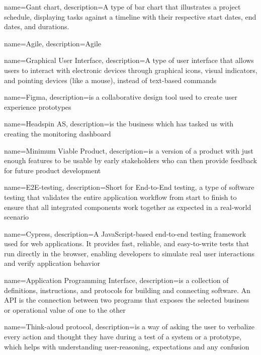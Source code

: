 {
    name=Gant chart,
    description={A type of bar chart that illustrates a project schedule, displaying tasks against a timeline with their respective start dates, end dates, and durations.}
}

{
    name=Agile,
    description={Agile}
}


{
    name={Graphical User Interface},
    description={A type of user interface that allows users to interact with electronic devices through graphical icons, visual indicators, and pointing devices (like a mouse), instead of text-based commands}
}

{
    name={Figma},
    description={is a collaborative design tool used to create user experience prototypes}
}

{
    name={Headspin AS},
    description={is the business which has tasked us with creating the monitoring dashboard}
}

{
    name={Minimum Viable Product},
    description={is a version of a product with just enough features to be usable by early stakeholders who can then provide feedback for future product development}
}

{
    name=E2E-testing,
    description={Short for End-to-End testing, a type of software testing that validates the entire application workflow from start to finish to ensure that all integrated components work together as expected in a real-world scenario}
}

{
    name=Cypress,
    description={A JavaScript-based end-to-end testing framework used for web applications. It provides fast, reliable, and easy-to-write tests that run directly in the browser, enabling developers to simulate real user interactions and verify application behavior}
}

{
    name=Application Programming Interface,
    description={is a collection of definitions, instructions, and protocols for building and connecting software. An API is the connection between two programs that exposes the selected business or operational value of one to the other}
}

{
    name=Think-aloud protocol,
    description={is a way of asking the user to verbalize every action and thought they have during a test of a system or a prototype, which helps with understanding user-reasoning, expectations and any confusion}
}

